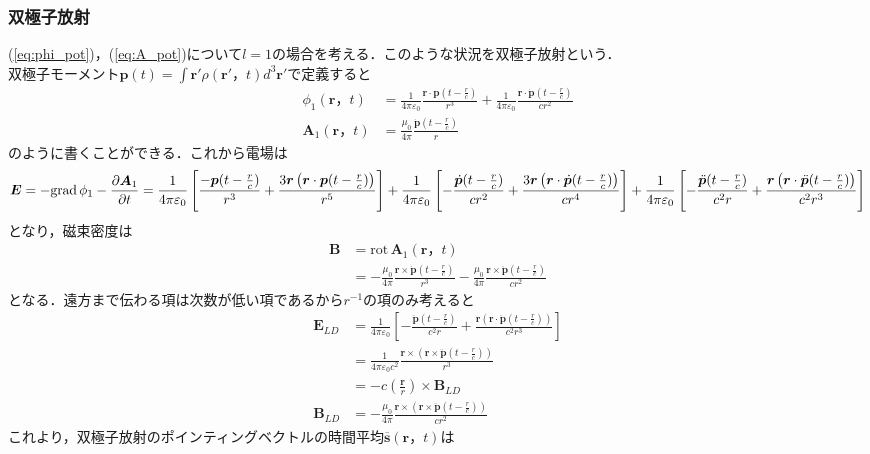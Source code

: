 \documentclass[a4j,10pt,oneside,openany]{jsbook}
\newcommand{\grad}{\mathrm{grad}\,}  %
\newcommand{\rot}{\mathrm{rot}\,}  %
\newcommand{\vE}{\boldsymbol{E}}
\newcommand{\vB}{\boldsymbol{B}}
\newcommand{\vs}{\boldsymbol{s}}
\newcommand{\vr}{\boldsymbol{r}}
\newcommand{\vA}{\boldsymbol{A}}
\newcommand{\vp}{\boldsymbol{p}}
\newcommand{\del}{\partial}
\begin{document}
{\subsubsection{双極子放射}
(\ref{eq:phi_pot})，(\ref{eq:A_pot})について$l=1$の場合を考える．このような状況を双極子放射という．\\双極子モーメント$\vp (t)=\int \vr'\rho(\vr'，t)d^3\vr'$で定義すると
\begin{align}
  \phi_1(\vr，t)&= \frac{1}{4\pi\varepsilon_0} \frac{\vr\cdot\vp (t-\frac{r}{c})}{r^3}+\frac{1}{4\pi\varepsilon_0} \frac{\vr\cdot\dot{\vp} (t-\frac{r}{c})}{cr^2}\\
  \vA_1(\vr，t)&=\frac{\mu_0}{4\pi}\frac{\dot{\vp} (t-\frac{r}{c})}{r}
\end{align}
のように書くことができる．これから電場は
\begin{dmath}
  \vE=-\grad{\phi_1}-\frac{\del \vA_1}{\del t}\\
  =\frac{1}{4\pi\varepsilon_0}\left[\frac{-\vp (t-\frac{r}{c})}{r^3}+\frac{3\vr\left(\vr\cdot\vp (t-\frac{r}{c})\right)}{r^5}\right]+\frac{1}{4\pi\varepsilon_0}\left[-\frac{\dot{\vp} (t-\frac{r}{c})}{cr^2}+\frac{3\vr\left(\vr\cdot\dot{\vp} (t-\frac{r}{c})   \right)}{cr^4}  \right]+\frac{1}{4\pi\varepsilon_0}\left[-\frac{\ddot{\vp} (t-\frac{r}{c}) }{c^2r}+\frac{\vr\left(\vr\cdot\ddot{\vp} (t-\frac{r}{c})\right)}{c^2 r^3}\right]
\end{dmath}
となり，磁束密度は
\begin{align}
  \vB&=\rot{\vA_1 (\vr，t)}\nonumber\\
  &=-\frac{\mu_0}{4\pi}\frac{\vr\times\dot{\vp}(t-\frac{r}{c})}{r^3}-\frac{\mu_0}{4\pi}\frac{\vr\times\ddot{\vp}(t-\frac{r}{c})}{cr^2}
\end{align}
となる．遠方まで伝わる項は次数が低い項であるから$r^{-1}$の項のみ考えると
\begin{align}
  \vE_{LD}&=\frac{1}{4\pi\varepsilon_0}\left[-\frac{\ddot{\vp}(t-\frac{r}{c})}{c^2 r}+\frac{\vr\left(\vr\cdot\ddot{\vp}(t-\frac{r}{c}) \right)}{c^2 r^3}\right]\nonumber\\
  &=\frac{1}{4\pi\varepsilon_0 c^2}\frac{\vr\times\left(\vr\times\ddot{\vp}(t-\frac{r}{c})\right)}{r^3}\nonumber\\
  &=-c\left(\frac{\vr}{r}\right)\times\vB_{LD}\\
  \vB_{LD}&=-\frac{\mu_0}{4\pi}\frac{\vr\times\left(\vr\times\ddot{\vp}(t-\frac{r}{c})\right)}{cr^2}
\end{align}
これより，双極子放射のポインティングベクトルの時間平均$\overline{\vs}(\vr，t)$は
\begin{align}

\end{align}}
\end{document}
